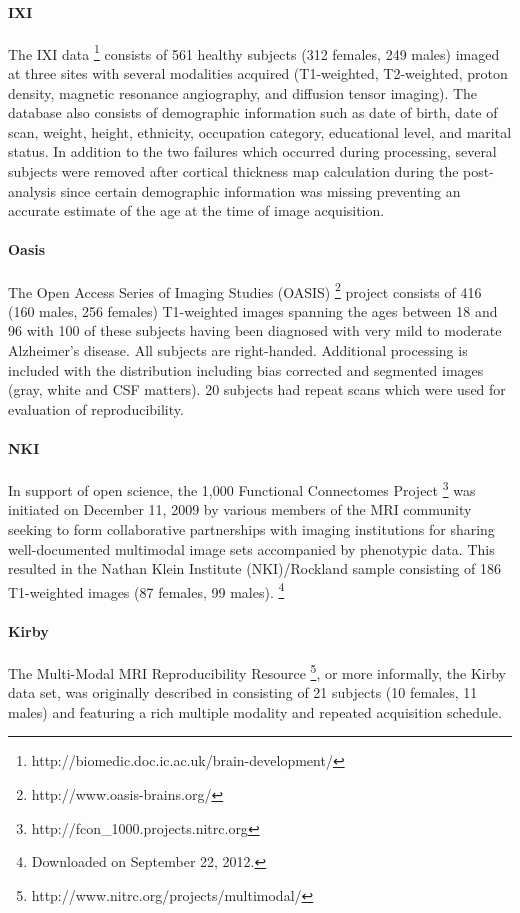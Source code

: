 \paragraph{IXI}
The IXI data%
\footnote{
http://biomedic.doc.ic.ac.uk/brain-development/
}
consists of 561 healthy subjects (312 females, 249 males) imaged at three sites 
with several modalities acquired (T1-weighted, T2-weighted, proton density, magnetic 
resonance angiography, and diffusion tensor imaging).  The 
database also consists of  demographic information such as date of birth, date
of scan, weight,
height, ethnicity, occupation category, educational level, and marital status.
In addition to the two failures which occurred during processing, several subjects 
were removed after cortical thickness map calculation during the post-analysis 
since certain demographic information was missing preventing an accurate estimate of 
the age at the time of image acquisition.

\paragraph{Oasis}
The Open Access Series of Imaging Studies (OASIS)%
\footnote{
http://www.oasis-brains.org/
}
 project consists of 416
(160 males, 256 females) T1-weighted images spanning 
the ages between 18 and 96 with 100 of these subjects having been 
diagnosed with very mild to moderate Alzheimer's disease.  
All subjects are right-handed.  Additional processing is included
with the distribution including bias corrected and segmented images
(gray, white and CSF matters).  20 subjects had repeat scans which
were used for evaluation of reproducibility.

\paragraph{NKI}
In support of open science, the 1,000 Functional Connectomes Project%
\footnote{ 
http://fcon\_1000.projects.nitrc.org
}
was initiated on December 11, 2009 by various members of the MRI community
seeking to form collaborative partnerships with imaging institutions for 
sharing well-documented multimodal image sets accompanied by phenotypic data.
This resulted in the Nathan Klein Institute (NKI)/Rockland sample
consisting of 186 T1-weighted
images (87 females, 99 males).%
\footnote{
Downloaded on September 22, 2012.
}

\paragraph{Kirby}
The Multi-Modal MRI Reproducibility Resource%
\footnote{
http://www.nitrc.org/projects/multimodal/
}, 
or more informally, the Kirby
data set, was originally described in \cite{landman2011} consisting of 
21 subjects (10 females, 11 males) and featuring a rich multiple modality and 
repeated acquisition schedule.


